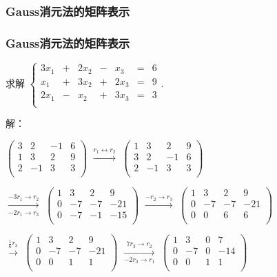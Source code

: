 \subsubsection{Gauss消元法的矩阵表示}
\begin{frame}\frametitle{Gauss消元法的矩阵表示}
\begin{example}[非齐次线性方程组]
求解 $\left\{\begin{array}{rrrrrrrrr}
3x_1 & + & 2x_2 & - & x_3 & = & 6 \\
x_1 & + & 3x_2 & + & 2x_3 & = & 9 \\
2x_1 & - & x_2 & + & 3x_3 & = & 3\\
\end{array}\right.$.
\end{example}
\pp
{解：\small {
$\left(\begin{array}{rrrr}3&2&-1&6\\1&3&2&9\\2&-1&3&3\\\end{array}\right)$ \pp
$\xrightarrow{r_1\leftrightarrow r_2}$
$\left(\begin{array}{rrrr}1&3&2&9\\3&2&-1&6\\2&-1&3&3\\\end{array}\right)$
\pp
\bigskip

$\xrightarrow[-2r_1\rightarrow r_3]{-3r_1\rightarrow r_2}$
$\left(\begin{array}{rrrr}1&3&2&9\\0&-7&-7&-21\\0&-7&-1&-15\\\end{array}\right)$ \pp
$\xrightarrow{-r_2\rightarrow r_3}$
$\left(\begin{array}{rrrr}1&3&2&9\\0&-7&-7&-21\\0&0&6&6\\\end{array}\right)$
\pp
\bigskip

$\xrightarrow{\frac16r_3}$
$\left(\begin{array}{rrrr}1&3&2&9\\0&-7&-7&-21\\0&0&1&1\\\end{array}\right)$ \pp
$\xrightarrow[-2r_3\rightarrow r_1]{7r_3\rightarrow r_2}$
$\left(\begin{array}{rrrr}1&3&0&7\\0&-7&0&-14\\0&0&1&1\\\end{array}\right)$	 \pp
\bigskip

}}
\end{frame}
